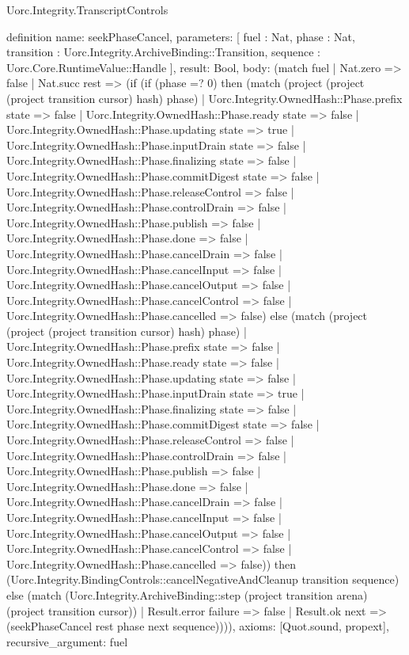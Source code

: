 \begin{lexlean}{Uorc.Integrity.TranscriptControls}
\begin{semanticmodule}
definition{
  name: seekPhaseCancel,
  parameters: [
    fuel : Nat,
    phase : Nat,
    transition : Uorc.Integrity.ArchiveBinding::Transition,
    sequence : Uorc.Core.RuntimeValue::Handle
  ],
  result: Bool,
  body: (match fuel
    | Nat.zero => false
    | Nat.succ rest => (if (if (phase =? 0) then (match (project (project (project transition cursor) hash) phase)
      | Uorc.Integrity.OwnedHash::Phase.prefix state => false
      | Uorc.Integrity.OwnedHash::Phase.ready state => false
      | Uorc.Integrity.OwnedHash::Phase.updating state => true
      | Uorc.Integrity.OwnedHash::Phase.inputDrain state => false
      | Uorc.Integrity.OwnedHash::Phase.finalizing state => false
      | Uorc.Integrity.OwnedHash::Phase.commitDigest state => false
      | Uorc.Integrity.OwnedHash::Phase.releaseControl => false
      | Uorc.Integrity.OwnedHash::Phase.controlDrain => false
      | Uorc.Integrity.OwnedHash::Phase.publish => false
      | Uorc.Integrity.OwnedHash::Phase.done => false
      | Uorc.Integrity.OwnedHash::Phase.cancelDrain => false
      | Uorc.Integrity.OwnedHash::Phase.cancelInput => false
      | Uorc.Integrity.OwnedHash::Phase.cancelOutput => false
      | Uorc.Integrity.OwnedHash::Phase.cancelControl => false
      | Uorc.Integrity.OwnedHash::Phase.cancelled => false) else (match (project (project (project transition cursor) hash) phase)
      | Uorc.Integrity.OwnedHash::Phase.prefix state => false
      | Uorc.Integrity.OwnedHash::Phase.ready state => false
      | Uorc.Integrity.OwnedHash::Phase.updating state => false
      | Uorc.Integrity.OwnedHash::Phase.inputDrain state => true
      | Uorc.Integrity.OwnedHash::Phase.finalizing state => false
      | Uorc.Integrity.OwnedHash::Phase.commitDigest state => false
      | Uorc.Integrity.OwnedHash::Phase.releaseControl => false
      | Uorc.Integrity.OwnedHash::Phase.controlDrain => false
      | Uorc.Integrity.OwnedHash::Phase.publish => false
      | Uorc.Integrity.OwnedHash::Phase.done => false
      | Uorc.Integrity.OwnedHash::Phase.cancelDrain => false
      | Uorc.Integrity.OwnedHash::Phase.cancelInput => false
      | Uorc.Integrity.OwnedHash::Phase.cancelOutput => false
      | Uorc.Integrity.OwnedHash::Phase.cancelControl => false
      | Uorc.Integrity.OwnedHash::Phase.cancelled => false)) then (Uorc.Integrity.BindingControls::cancelNegativeAndCleanup transition sequence) else (match (Uorc.Integrity.ArchiveBinding::step (project transition arena) (project transition cursor))
      | Result.error failure => false
      | Result.ok next => (seekPhaseCancel rest phase next sequence)))),
  axioms: [Quot.sound, propext],
  recursive_argument: fuel
}


\end{semanticmodule}
\end{lexlean}
